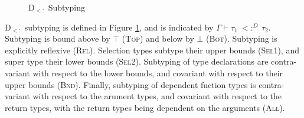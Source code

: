 \documentclass[runningheads, anon]{llncs}
\begin{document}
\begin{figure}[t]
\small
{}
\caption{D$_{<:}$ Subtyping}
\label{f:dsub:subtyping}
\end{figure}
D$_{<:}$ subtyping is defined in Figure \ref{f:dsub:subtyping}, and is indicated by $\Gamma \vdash \tau_1\ <:^D\ \tau_2$. Subtyping is bound above by $\top$ (\textsc{Top}) and below by $\bot$ (\textsc{Bot}).
Subtyping is explicitly reflexive (\textsc{Rfl}). Selection types subtype their upper bounds (\textsc{Sel1}), and super type their lower bounds (\textsc{Sel2}).
Subtyping of type declarations are contra-variant with respect to the lower bounds, and covariant with respect to their upper bounds (\textsc{Bnd}).
Finally, subtyping of dependent fuction types is contra-variant with respect to the arument types, and covariant with respect to the return types, 
with the return types being dependent on the arguments (\textsc{All}).
\end{document}
